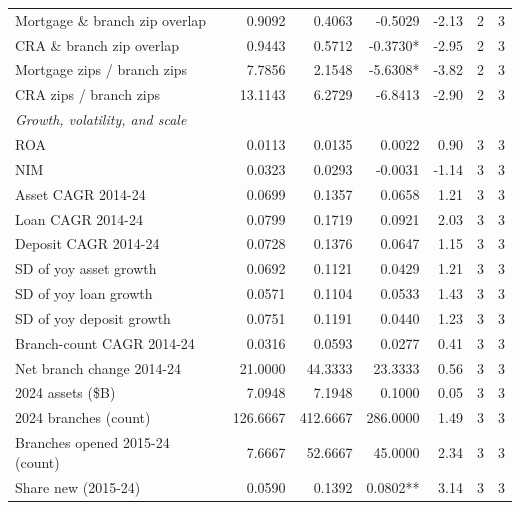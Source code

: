 \begin{tabular}{lrrrrrr}
Mortgage \& branch zip overlap & 0.9092 & 0.4063 & -0.5029 & -2.13 & 2 & 3 \\
CRA \& branch zip overlap & 0.9443 & 0.5712 & -0.3730* & -2.95 & 2 & 3 \\
Mortgage zips / branch zips & 7.7856 & 2.1548 & -5.6308* & -3.82 & 2 & 3 \\
CRA zips / branch zips & 13.1143 & 6.2729 & -6.8413 & -2.90 & 2 & 3 \\
\midrule
\multicolumn{7}{l}{\emph{Growth, volatility, and scale}} \\
\midrule
ROA & 0.0113 & 0.0135 & 0.0022 & 0.90 & 3 & 3 \\
NIM & 0.0323 & 0.0293 & -0.0031 & -1.14 & 3 & 3 \\
Asset CAGR 2014-24 & 0.0699 & 0.1357 & 0.0658 & 1.21 & 3 & 3 \\
Loan CAGR 2014-24 & 0.0799 & 0.1719 & 0.0921 & 2.03 & 3 & 3 \\
Deposit CAGR 2014-24 & 0.0728 & 0.1376 & 0.0647 & 1.15 & 3 & 3 \\
SD of yoy asset growth & 0.0692 & 0.1121 & 0.0429 & 1.21 & 3 & 3 \\
SD of yoy loan growth & 0.0571 & 0.1104 & 0.0533 & 1.43 & 3 & 3 \\
SD of yoy deposit growth & 0.0751 & 0.1191 & 0.0440 & 1.23 & 3 & 3 \\
Branch-count CAGR 2014-24 & 0.0316 & 0.0593 & 0.0277 & 0.41 & 3 & 3 \\
Net branch change 2014-24 & 21.0000 & 44.3333 & 23.3333 & 0.56 & 3 & 3 \\
2024 assets (\$B) & 7.0948 & 7.1948 & 0.1000 & 0.05 & 3 & 3 \\
2024 branches (count) & 126.6667 & 412.6667 & 286.0000 & 1.49 & 3 & 3 \\
Branches opened 2015-24 (count) & 7.6667 & 52.6667 & 45.0000 & 2.34 & 3 & 3 \\
Share new (2015-24) & 0.0590 & 0.1392 & 0.0802** & 3.14 & 3 & 3 \\
\bottomrule
\end{tabular}

